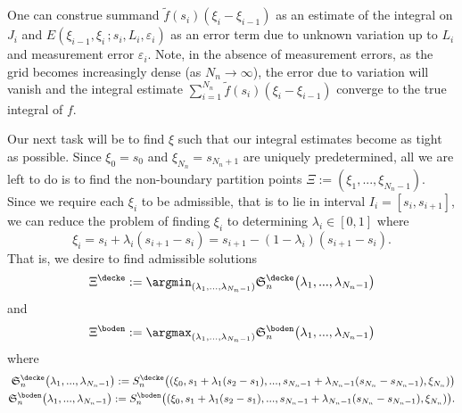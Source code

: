 One can construe summand $ \tilde f(s_i) (\xi_{i} - \xi_{i-1})$ as an estimate of the integral on $J_i$
and $ E(\xi_{i-1},\xi_i \,; s_i,L_i,\varepsilon_i)$ as an error term due to unknown variation up to $L_i$ and measurement error $\varepsilon_i$.
Note, in the absence of measurement errors, as the grid becomes increasingly dense (as ${N_n} \to \infty$), the error due to variation will vanish and the integral estimate $\sum_{i=1}^{N_n} \tilde f(s_i) (\xi_{i} - \xi_{i-1})$ converge to the true integral of $f$.

%
%

Our next task will be to find $\xi$ such that our integral estimates become as tight as possible. 
Since $\xi_0 = s_0 $ and $\xi_{{N_n}} = s_{{N_n}+1}$ are uniquely predetermined, 
all we are left to do is to find the non-boundary partition points 
$\Xi:=(\xi_1,...,\xi_{{N_n}-1})$. Since we require each $\xi_i$ to be admissible, that is to lie in interval $I_i = [s_{i},s_{i+1}]$, we can reduce the problem of finding $\xi_i$ to determining $\lambda_i \in [0,1]$ where \[\xi_i = s_{i} + \lambda_i (s_{i+1}-s_{i}) = s_{i+1} - (1-\lambda_i) (s_{i+1}-s_{i}) .\]  
That is, we desire to find admissible solutions
\begin{equation}
\Xi^\decke := \argmin_{(\lambda_1,...,\lambda_{{N_n}-1})} \mathfrak S^\decke_n\bigl(\lambda_1,...,\lambda_{{N_n}-1}\bigr)
\end{equation} and
 \begin{equation}
\Xi^\boden := \argmax_{(\lambda_1,...,\lambda_{{N_n}-1})} \mathfrak S^\boden_n\bigl(\lambda_1,...,\lambda_{{N_n}-1}\bigr)
\end{equation}
where  
\begin{align}
\mathfrak S^\decke_n\bigl(\lambda_1,...,\lambda_{{N_n}-1}\bigr) := S^\decke_n\bigl((\xi_0,s_{1} + \lambda_1 (s_{2}-s_{1}),...,s_{{N_n}-1} + \lambda_{{N_n}-1} (s_{{N_n}}-s_{{N_n}-1}),\xi_{{N_n}})\bigr)\\
\mathfrak S^\boden_n\bigl(\lambda_1,...,\lambda_{{N_n}-1}\bigr) := S^\boden_n\bigl((\xi_0,s_{1} + \lambda_1 (s_{2}-s_{1}),...,s_{{N_n}-1} + \lambda_{{N_n}-1} (s_{{N_n}}-s_{{N_n}-1}),\xi_{{N_n}})\bigr).
\end{align}

